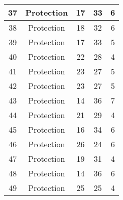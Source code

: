 \documentclass[results.tex]{subfiles}
\begin{document}
\begin{center}
\begin{tabular}{| c || c | c | c | c |}
            \hline
            37                      & Protection                   & 17                     & 33                      & 6                    \\
            \hline
            38                      & Protection                   & 18                     & 32                      & 6                    \\
            \hline
            39                      & Protection                   & 17                     & 33                      & 5                    \\
            \hline
            40                      & Protection                   & 22                     & 28                      & 4                    \\
            \hline
            41                      & Protection                   & 23                     & 27                      & 5                    \\
            \hline
            42                      & Protection                   & 23                     & 27                      & 5                    \\
            \hline
            43                      & Protection                   & 14                     & 36                      & 7                    \\
            \hline
            44                      & Protection                   & 21                     & 29                      & 4                    \\
            \hline
            45                      & Protection                   & 16                     & 34                      & 6                    \\
            \hline
            46                      & Protection                   & 26                     & 24                      & 6                    \\
            \hline
            47                      & Protection                   & 19                     & 31                      & 4                    \\
            \hline
            48                      & Protection                   & 14                     & 36                      & 6                    \\
            \hline
            49                      & Protection                   & 25                     & 25                      & 4                    \\
            \hline
        \end{tabular}
    \end{center}
\end{document}
